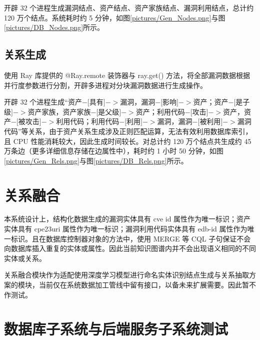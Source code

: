 \documentclass[a4paper,AutoFakeBold,oneside,12pt]{book}
\begin{document}
开辟 32 个进程生成漏洞结点、资产结点、资产家族结点、漏洞利用结点，总计约 120 万个结点。系统耗时约 5 分钟，如图\ref{pictures/Gen_Nodes.png}与图\ref{pictures/DB_Nodes.png}所示。



\subsection{关系生成}

使用 Ray 库提供的 @Ray.remote 装饰器与 ray.get() 方法，将全部漏洞数据根据并行度参数进行分割，开辟多进程对分块漏洞数据进行生成操作。

开辟 32 个进程生成“资产$-[$具有$]->$漏洞，漏洞$-[$影响$]->$资产；资产$-[$是子级$]->$资产家族，资产家族$-[$是父级$]->$资产；利用代码$-[$攻击$]->$资产，资产$-[$被攻击$]->$利用代码；利用代码$-[$利用$]->$漏洞，漏洞$-[$被利用$]->$漏洞代码”等关系，由于资产关系生成涉及正则匹配运算，无法有效利用数据库索引，且 CPU 性能消耗较大，因此生成时间较长。对总计约 120 万个结点共生成约 45 万条边（更多详细信息存储在边属性中），耗时约 1 小时 50 分钟，如图\ref{pictures/Gen_Rels.png}与图\ref{pictures/DB_Rels.png}所示。



\section{关系融合}

本系统设计上，结构化数据生成的漏洞实体具有 cve id 属性作为唯一标识；资产实体具有 cpe23uri 属性作为唯一标识；漏洞利用代码实体具有 edb-id 属性作为唯一标识。且在数据库控制器对象的方法中，使用 MERGE 等 CQL 子句保证不会向数据库插入重复的实体或属性。因此当前知识图谱内并不会出现语义相同的不同实体或关系。

关系融合模块作为适配使用深度学习模型进行命名实体识别结点生成与关系抽取方案的模块，当前仅在系统数据加工管线中留有接口，以备未来扩展需要。因此暂不作测试。

\section{数据库子系统与后端服务子系统测试}
\end{document}

